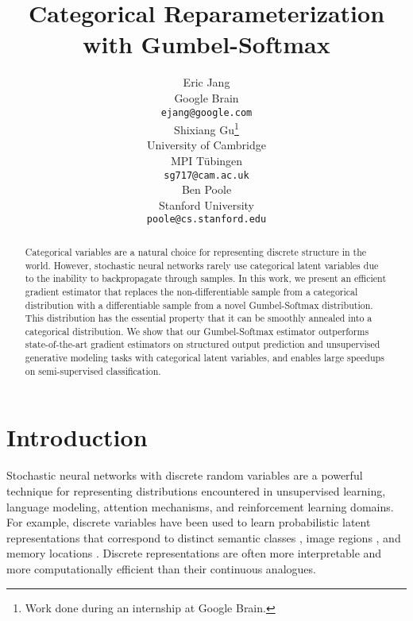 \documentclass{article} %
\title{Categorical Reparameterization\\ with Gumbel-Softmax}
\author{Eric Jang\\
Google Brain\\
\texttt{ejang@google.com} \\
\And
Shixiang Gu\thanks{Work done during an internship at Google Brain.}\\
University of Cambridge \\
MPI T\"{u}bingen \\
\texttt{sg717@cam.ac.uk} \\
\And
Ben Poole\samethanks\\ 
Stanford University \\
\texttt{poole@cs.stanford.edu}
}
\begin{document}
\maketitle

\begin{abstract}
Categorical variables are a natural choice for representing discrete structure in the world. However, stochastic neural networks rarely use categorical latent variables due to the inability to backpropagate through samples. In this work, we present an efficient gradient estimator that replaces the non-differentiable sample from a categorical distribution with a differentiable sample from a novel Gumbel-Softmax distribution. This distribution has the essential property that it can be smoothly annealed into a categorical distribution. We show that our Gumbel-Softmax estimator outperforms state-of-the-art gradient estimators on structured output prediction and unsupervised generative modeling tasks with categorical latent variables, and enables large speedups on semi-supervised classification.
\end{abstract}


\section{Introduction}


Stochastic neural networks with discrete random variables are a powerful technique for representing distributions encountered in unsupervised learning, language modeling, attention mechanisms, and reinforcement learning domains. For example, discrete variables have been used to learn probabilistic latent representations that correspond to distinct semantic classes \citep{kingma_ssvae}, image regions \citep{DBLP:journals/corr/XuBKCCSZB15}, and memory locations \citep{DBLP:journals/corr/GravesWD14,graves2016hybrid}. Discrete representations are often more interpretable \citep{DBLP:journals/corr/ChenDHSSA16} and more computationally efficient \citep{2016arXiv161009027R} than their continuous analogues.
\end{document}
